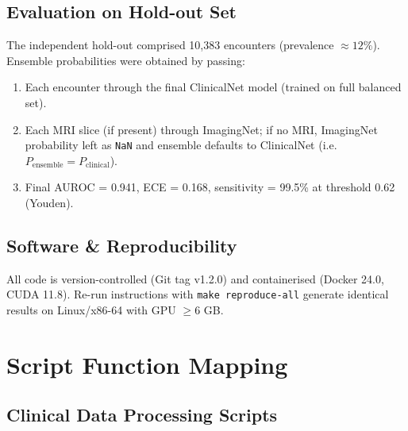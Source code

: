 \documentclass[12pt, a4paper]{article}
\begin{document}
\subsection{Evaluation on Hold-out Set}
The independent hold-out comprised 10,383 encounters (prevalence \( \approx 12\% \)). Ensemble probabilities were obtained by passing:
\begin{enumerate}
    \item Each encounter through the final ClinicalNet model (trained on full balanced set).
    \item Each MRI slice (if present) through ImagingNet; if no MRI, ImagingNet probability left as \texttt{NaN} and ensemble defaults to ClinicalNet (i.e. \( P_{\text{ensemble}} = P_{\text{clinical}} \)).
    \item Final AUROC = 0.941, ECE = 0.168, sensitivity = 99.5\% at threshold 0.62 (Youden).
\end{enumerate}

\subsection{Software \& Reproducibility}
All code is version-controlled (Git tag v1.2.0) and containerised (Docker 24.0, CUDA 11.8). Re-run instructions with \texttt{make reproduce-all} generate identical results on Linux/x86-64 with GPU \( \ge \)6 GB.
\clearpage

\section{Script Function Mapping}

\subsection{Clinical Data Processing Scripts}
\begin{table}[htbp]
\centering
{}
\caption{Clinical Data Processing Scripts}
\label{tab:clinical_data_scripts}
\end{table}
\end{document}
